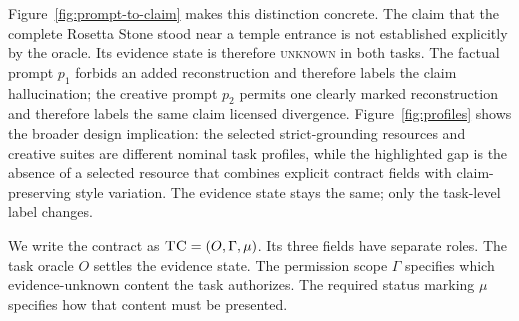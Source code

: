 \documentclass{clv2025}
\newcommand{\TC}{\textsc{TC}}
\begin{document}
Figure~\ref{fig:prompt-to-claim} makes this distinction concrete. The claim
that the complete Rosetta Stone stood near a temple entrance is not established explicitly by the oracle. %
Its evidence state is therefore \textsc{unknown} in both tasks. The factual prompt $p_1$ forbids an added
reconstruction and therefore labels the claim hallucination; the creative
prompt $p_2$ permits one clearly marked reconstruction and therefore labels the
same claim licensed divergence. Figure~\ref{fig:profiles} shows the broader
design implication: the selected strict-grounding resources and creative suites
are different nominal task profiles, while the highlighted gap is the absence
of a selected resource that combines explicit contract fields with
claim-preserving style variation. The evidence state stays the same; only the
task-level label changes.

We write the contract as $\TC=(O,\Gamma,\mu)$. Its three fields have separate
roles. The task oracle $O$ settles the evidence state. The permission scope
$\Gamma$ specifies which evidence-unknown content the task authorizes. The
required status marking $\mu$ specifies how that content must be presented.
\FloatBarrier
\end{document}
